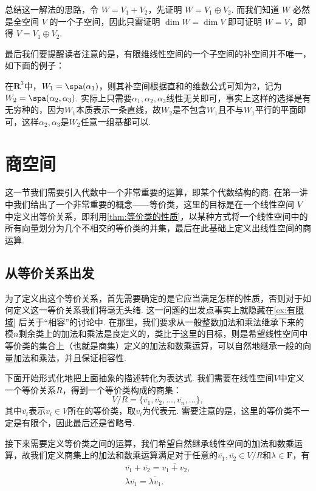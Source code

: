 总结这一解法的思路，令 $W = V_1 + V_2$，先证明 $W = V_1 \oplus V_2$. 而我们知道 $W$ 必然是全空间 $V$ 的一个子空间，因此只需证明 $\dim W = \dim V$ 即可证明 $W = V$，即得 $V = V_1 \oplus V_2$.

最后我们要提醒读者注意的是，有限维线性空间的一个子空间的补空间并不唯一，如下面的例子：
\begin{example}{}{}
    在$\mathbf{R}^3$中，$W_1=\spa(\alpha_1)$，则其补空间根据直和的维数公式可知为2，记为$W_2=\spa(\alpha_2,\alpha_3)$. 实际上只需要$\alpha_1,\alpha_2,\alpha_3$线性无关即可，事实上这样的选择是有无穷种的，因为$W_1$本质表示一条直线，故$W_2$是不包含$W_1$且不与$W_1$平行的平面即可，这样$\alpha_2,\alpha_3$是$W_2$任意一组基都可以.
\end{example}

\section{商空间}

这一节我们需要引入代数中一个非常重要的运算，即某个代数结构的商. 在第一讲中我们给出了一个非常重要的概念——等价类，这里的目标是在一个线性空间 $V$ 中定义出等价关系，即利用\autoref{thm:等价类的性质}，以某种方式将一个线性空间中的所有向量划分为几个不相交的等价类的并集，最后在此基础上定义出线性空间的商运算.

\subsection{从等价关系出发}

为了定义出这个等价关系，首先需要确定的是它应当满足怎样的性质，否则对于如何定义这一等价关系我们将毫无头绪. 这一问题的出发点事实上就隐藏在\autoref{ex:有限域} 后关于``相容''的讨论中. 在那里，我们要求从一般整数加法和乘法继承下来的模$n$剩余类上的加法和乘法是良定义的，类比于这里的目标，则是希望线性空间中等价类的集合上（也就是商集）定义的加法和数乘运算，可以自然地继承一般的向量加法和乘法，并且保证相容性.

下面开始形式化地把上面抽象的描述转化为表达式. 我们需要在线性空间$V$中定义一个等价关系$R$，得到一个等价类构成的商集：
\[V/R=\{\overline{v_1},\overline{v_2},\ldots,\overline{v_n},\ldots\},\]
其中$\overline{v_i}$表示$v_i\in V$所在的等价类，取$v_i$为代表元. 需要注意的是，这里的等价类不一定是有限个，因此最后还是省略号.

接下来需要定义等价类之间的运算，我们希望自然继承线性空间的加法和数乘运算，故我们定义商集上的加法和数乘运算满足对于任意的$\overline{v_1},\overline{v_2}\in V/R$和$\lambda\in\mathbf{F}$，有
\begin{equation} \label{eq:10:商集运算}
    \begin{gathered}
        \overline{v_1}+\overline{v_2}=\overline{v_1+v_2},\\
        \lambda\overline{v_1}=\overline{\lambda v_1}.
    \end{gathered}
\end{equation}

